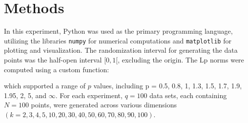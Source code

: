 \section{Methods}
In this experiment, Python was used as the primary programming language, utilizing the
libraries \texttt{numpy} for numerical computations and \texttt{matplotlib} for plotting
and visualization. The randomization interval for generating the data points was the
half-open interval \([0,1[\), excluding the origin. The Lp norms were computed using
a custom function:



which supported a range of \(p\) values, including p = 0.5, 0.8, 1, 1.3, 1.5, 1.7, 1.9,
1.95, 2, 5, and \(\infty\). For each experiment, \(q = 100\) data sets, each containing
\(N = 100\) points, were generated across various dimensions \((k = 2, 3, 4, 5, 10, 20,
30, 40, 50, 60, 70, 80, 90, 100)\).
